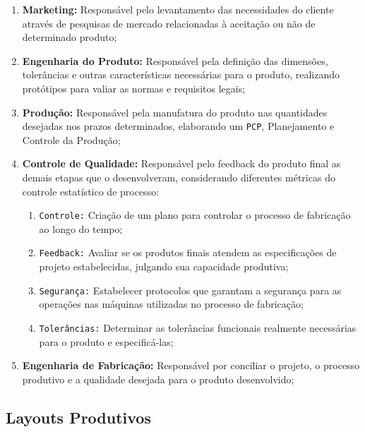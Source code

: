 \documentclass{article}
\begin{document}
                \begin{enumerate}[rightmargin = \leftmargin]
                    \item \textbf{Marketing:} Responsável pelo levantamento das necessidades do cliente através de pesquisas de mercado relacionadas à aceitação ou não de determinado produto;

                    \item \textbf{Engenharia do Produto:} Responsável pela definição das dimensões, tolerâncias e outras características necessárias para o produto, realizando protótipos para valiar as normas e requisitos legais;

                    \item \textbf{Produção:} Responsável pela manufatura do produto nas quantidades desejadas nos prazos determinados, elaborando um \texttt{PCP}, Planejamento e Controle da Produção;

                    \item \textbf{Controle de Qualidade:} Responsável pelo feedback do produto final as demais etapas que o desenvolveram, considerando diferentes métricas do controle estatístico de processo:
                        \begin{enumerate}[rightmargin = \leftmargin, noitemsep]
                            \item \texttt{Controle:} Criação de um plano para controlar o processo de fabricação ao longo do tempo;
                            \item \texttt{Feedback:} Avaliar se os produtos finais atendem as especificações de projeto estabelecidas, julgando sua capacidade produtiva;
                            \item \texttt{Segurança:} Estabelecer protocolos que garantam a segurança para as operações nas máquinas utilizadas no processo de fabricação;
                            \item \texttt{Tolerâncias:} Determinar as tolerâncias funcionais realmente necessárias para o produto e especificá-las;
                        \end{enumerate}

                    \item \textbf{Engenharia de Fabricação:} Responsável por conciliar o projeto, o processo produtivo e a qualidade desejada para o produto desenvolvido;
                \end{enumerate}

        \subsection{Layouts Produtivos}
\end{document}
